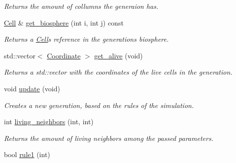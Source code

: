 \begin{DoxyCompactItemize}
\begin{DoxyCompactList}\small\item\em Returns the amount of collumns the generaion has. \end{DoxyCompactList}\item 
\mbox{\label{classLife_a7e16602403239490489aea230642d334}} 
\hyperlink{classCell}{Cell} \& \hyperlink{classLife_a7e16602403239490489aea230642d334}{get\+\_\+biosphere} (int i, int j) const
\begin{DoxyCompactList}\small\item\em Returns a \hyperlink{classCell}{Cell}\textquotesingle{}s reference in the generation\textquotesingle{}s biosphere. \end{DoxyCompactList}\item 
\mbox{\label{classLife_a347f895c89cfef9d5c74f5b549f2a8d5}} 
std\+::vector$<$ \hyperlink{classCoordinate}{Coordinate} $>$ \hyperlink{classLife_a347f895c89cfef9d5c74f5b549f2a8d5}{get\+\_\+alive} (void)
\begin{DoxyCompactList}\small\item\em Returns a std\+::vector with the coordinates of the live cells in the generation. \end{DoxyCompactList}\item 
\mbox{\label{classLife_a52846a7310d07423d3e03154f5c693f8}} 
void \hyperlink{classLife_a52846a7310d07423d3e03154f5c693f8}{update} (void)
\begin{DoxyCompactList}\small\item\em Creates a new generation, based on the rules of the simulation. \end{DoxyCompactList}\item 
\mbox{\label{classLife_ae1616d4b8f68527279610da101f4964c}} 
int \hyperlink{classLife_ae1616d4b8f68527279610da101f4964c}{living\+\_\+neighbors} (int, int)
\begin{DoxyCompactList}\small\item\em Returns the amount of living neighbors among the passed parameters. \end{DoxyCompactList}\item 
\mbox{\label{classLife_a31350090246d57337c599b1ed3612f04}} 
bool \hyperlink{classLife_a31350090246d57337c599b1ed3612f04}{rule1} (int)

\end{DoxyCompactItemize}
